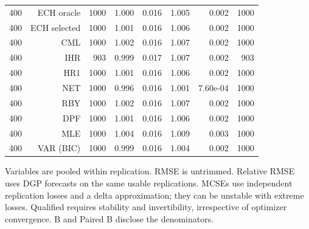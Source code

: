\begin{table}[p]
\begin{tabular}{rrrrrrrr}
400 & ECH oracle & 1000 & 1.000 & 0.016 & 1.005 & 0.002 & 1000 \\
400 & ECH selected & 1000 & 1.001 & 0.016 & 1.006 & 0.002 & 1000 \\
400 & CML & 1000 & 1.002 & 0.016 & 1.007 & 0.002 & 1000 \\
400 & IHR &  903 & 0.999 & 0.017 & 1.007 & 0.002 &  903 \\
400 & HR1 & 1000 & 1.001 & 0.016 & 1.006 & 0.002 & 1000 \\
400 & NET & 1000 & 0.996 & 0.016 & 1.001 & 7.60e-04 & 1000 \\
400 & RBY & 1000 & 1.002 & 0.016 & 1.007 & 0.002 & 1000 \\
400 & DPF & 1000 & 1.001 & 0.016 & 1.006 & 0.002 & 1000 \\
400 & MLE & 1000 & 1.004 & 0.016 & 1.009 & 0.003 & 1000 \\
400 & VAR (BIC) & 1000 & 0.999 & 0.016 & 1.004 & 0.002 & 1000 \\
\bottomrule\end{tabular}
\par\medskip
\begin{minipage}{0.98\linewidth}\footnotesize Variables are pooled within replication. RMSE is untrimmed. Relative RMSE uses DGP forecasts on the same usable replications. MCSEs use independent replication losses and a delta approximation; they can be unstable with extreme losses. Qualified requires stability and invertibility, irrespective of optimizer convergence. B and Paired B disclose the denominators.\end{minipage}
\end{table}

